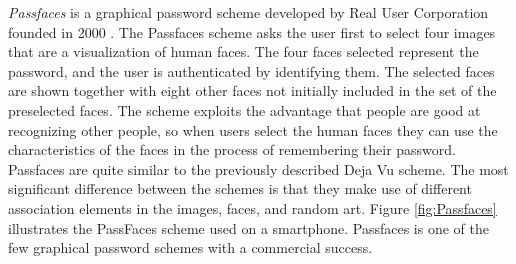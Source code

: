     \begin{figure}[H]
      \centering
    \end{figure}  

  {\it Passfaces} is a graphical password scheme developed by Real User Corporation founded in 2000 \cite{passface}. The Passfaces scheme asks the user first to select four images that are a visualization of human faces. The four faces selected represent the password, and the user is authenticated by identifying them. The selected faces are shown together with eight other faces not initially included in the set of the preselected faces. The scheme exploits the advantage that people are good at recognizing other people, so when users select the human faces they can use the characteristics of the faces in the process of remembering their password. Passfaces are quite similar to the previously described  Deja Vu scheme. The most significant difference between the schemes is that they make use of different association elements in the images, faces, and random art. Figure \ref{fig:Passfaces} illustrates the PassFaces scheme used on a smartphone. Passfaces is one of the few graphical password schemes with a commercial success. 

